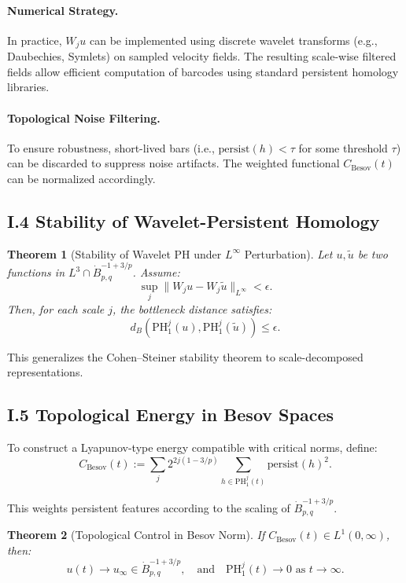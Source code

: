 \documentclass[11pt]{article}
\newtheorem{theorem}{Theorem}[section]
\theoremstyle{definition}
\begin{document}
\paragraph{Numerical Strategy.} In practice, $W_j u$ can be implemented using discrete wavelet transforms (e.g., Daubechies, Symlets) on sampled velocity fields. The resulting scale-wise filtered fields allow efficient computation of barcodes using standard persistent homology libraries.

\paragraph{Topological Noise Filtering.} To ensure robustness, short-lived bars (i.e., $\mathrm{persist}(h) < \tau$ for some threshold $\tau$) can be discarded to suppress noise artifacts. The weighted functional $C_{\text{Besov}}(t)$ can be normalized accordingly.

\subsection*{I.4 Stability of Wavelet-Persistent Homology}

\begin{theorem}[Stability of Wavelet PH under $L^\infty$ Perturbation]
Let $u, \tilde{u}$ be two functions in $L^3 \cap \dot{B}^{-1+3/p}_{p,q}$. Assume:
\[ \sup_j \|W_j u - W_j \tilde{u}\|_{L^\infty} < \epsilon. \]
Then, for each scale $j$, the bottleneck distance satisfies:
\[ d_B(\mathrm{PH}_1^j(u), \mathrm{PH}_1^j(\tilde{u})) \leq \epsilon. \]
\end{theorem}

This generalizes the Cohen--Steiner stability theorem to scale-decomposed representations.

\subsection*{I.5 Topological Energy in Besov Spaces}

To construct a Lyapunov-type energy compatible with critical norms, define:
\[ C_{\text{Besov}}(t) := \sum_{j} 2^{2j(1 - 3/p)} \sum_{h \in \mathrm{PH}_1^j(t)} \mathrm{persist}(h)^2. \]

This weights persistent features according to the scaling of $\dot{B}^{-1+3/p}_{p,q}$.

\begin{theorem}[Topological Control in Besov Norm]
If $C_{\text{Besov}}(t) \in L^1(0,\infty)$, then:
\[ u(t) \to u_\infty \in \dot{B}^{-1+3/p}_{p,q}, \quad \text{and} \quad \mathrm{PH}_1^j(t) \to 0 \text{ as } t \to \infty. \]
\end{theorem}
\end{document}
